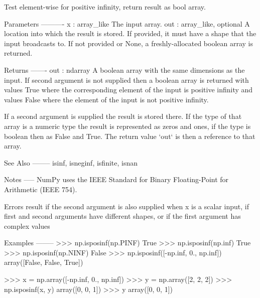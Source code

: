 \begin{DoxyVerb}Test element-wise for positive infinity, return result as bool array.

Parameters
----------
x : array_like
    The input array.
out : array_like, optional
    A location into which the result is stored. If provided, it must have a
    shape that the input broadcasts to. If not provided or None, a
    freshly-allocated boolean array is returned.

Returns
-------
out : ndarray
    A boolean array with the same dimensions as the input.
    If second argument is not supplied then a boolean array is returned
    with values True where the corresponding element of the input is
    positive infinity and values False where the element of the input is
    not positive infinity.

    If a second argument is supplied the result is stored there. If the
    type of that array is a numeric type the result is represented as zeros
    and ones, if the type is boolean then as False and True.
    The return value `out` is then a reference to that array.

See Also
--------
isinf, isneginf, isfinite, isnan

Notes
-----
NumPy uses the IEEE Standard for Binary Floating-Point for Arithmetic
(IEEE 754).

Errors result if the second argument is also supplied when x is a scalar
input, if first and second arguments have different shapes, or if the
first argument has complex values

Examples
--------
>>> np.isposinf(np.PINF)
True
>>> np.isposinf(np.inf)
True
>>> np.isposinf(np.NINF)
False
>>> np.isposinf([-np.inf, 0., np.inf])
array([False, False,  True])

>>> x = np.array([-np.inf, 0., np.inf])
>>> y = np.array([2, 2, 2])
>>> np.isposinf(x, y)
array([0, 0, 1])
>>> y
array([0, 0, 1])\end{DoxyVerb}
 